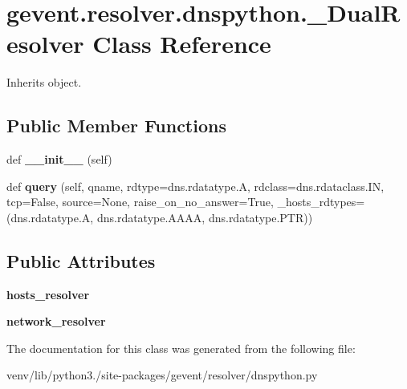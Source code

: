 \hypertarget{classgevent_1_1resolver_1_1dnspython_1_1___dual_resolver}{}\section{gevent.\+resolver.\+dnspython.\+\_\+\+Dual\+Resolver Class Reference}
\label{classgevent_1_1resolver_1_1dnspython_1_1___dual_resolver}


Inherits object.

\subsection*{Public Member Functions}
\begin{DoxyCompactItemize}
\item 
\mbox{\label{classgevent_1_1resolver_1_1dnspython_1_1___dual_resolver_a978afd2b03bd9ac28a1131799aa39ca4}} 
def {\bfseries \+\_\+\+\_\+init\+\_\+\+\_\+} (self)
\item 
\mbox{\label{classgevent_1_1resolver_1_1dnspython_1_1___dual_resolver_a8fd0e368dd089f7f2caf0a5d977c7326}} 
def {\bfseries query} (self, qname, rdtype=dns.\+rdatatype.\+A, rdclass=dns.\+rdataclass.\+IN, tcp=False, source=None, raise\+\_\+on\+\_\+no\+\_\+answer=True, \+\_\+hosts\+\_\+rdtypes=(dns.\+rdatatype.\+A, dns.\+rdatatype.\+A\+A\+AA, dns.\+rdatatype.\+P\+TR))
\end{DoxyCompactItemize}
\subsection*{Public Attributes}
\begin{DoxyCompactItemize}
\item 
\mbox{\label{classgevent_1_1resolver_1_1dnspython_1_1___dual_resolver_add7bca099e27ccfcb0877a38f7a247cd}} 
{\bfseries hosts\+\_\+resolver}
\item 
\mbox{\label{classgevent_1_1resolver_1_1dnspython_1_1___dual_resolver_ac621ff2632dcfe1fb776d6ec92d6aee5}} 
{\bfseries network\+\_\+resolver}
\end{DoxyCompactItemize}


The documentation for this class was generated from the following file\+:\begin{DoxyCompactItemize}
\item 
venv/lib/python3./site-\/packages/gevent/resolver/dnspython.\+py\end{DoxyCompactItemize}
